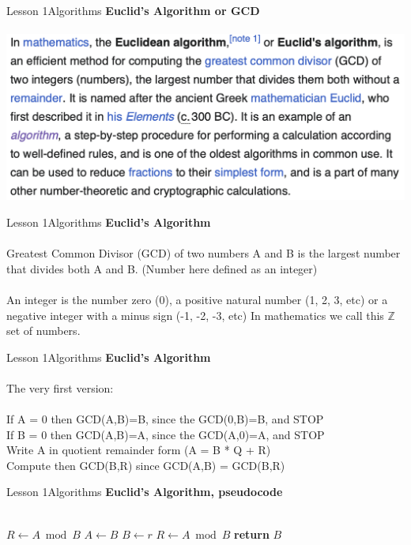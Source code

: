\documentclass[aspectratio=1610]{beamer}
\begin{document}
\begin{frame}{Lesson 1}{Algorithms}
\Large
\textbf{Euclid's Algorithm or GCD}\\~\\ 
\includegraphics[scale=0.7]{Images/gcd}
\end{frame}

\begin{frame}{Lesson 1}{Algorithms}
\Large
\textbf{Euclid's Algorithm}\\~\\ 
Greatest Common Divisor (GCD) of two numbers A and B is the largest number that divides both A and B. (Number here defined as an \alert{integer})\\~\\

An integer is the number zero (0), a positive natural number (1, 2, 3, etc) or a negative integer with a minus sign (-1, -2, -3, etc) In mathematics we call this \(\mathbb{Z}\) set of numbers.
\end{frame}


\begin{frame}{Lesson 1}{Algorithms}
\Large
\textbf{Euclid's Algorithm}\\~\\
The very first version:\\~\\ 
If A = 0 then GCD(A,B)=B, since the GCD(0,B)=B, and STOP\\  
If B = 0 then GCD(A,B)=A, since the GCD(A,0)=A, and STOP\\  
Write A in quotient remainder form (A = B * Q + R)\\
Compute then GCD(B,R) since GCD(A,B) = GCD(B,R)
\end{frame}


\begin{frame}{Lesson 1}{Algorithms}
\Large
\textbf{Euclid's Algorithm, pseudocode}\\~\\

\label{GCD}
\begin{algorithmic}[1]
   \State $R\gets A\bmod B$
      \State $A\gets B$
      \State $B\gets r$
      \State $R\gets A\bmod B$
   \EndWhile\label{GCDendwhile}
   \State \textbf{return} $B$
\EndProcedure
\end{algorithmic}
\end{frame}
\end{document}

